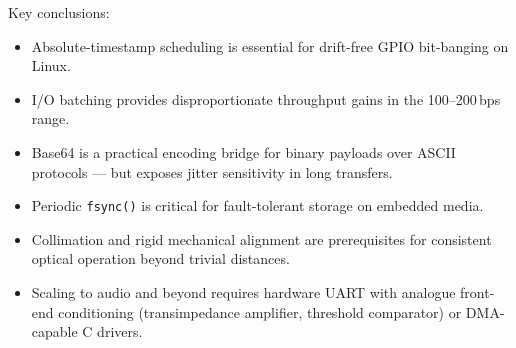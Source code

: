 \documentclass[10pt, twocolumn, a4paper]{article}
\begin{document}
Key conclusions:

\begin{itemize}[leftmargin=12pt, itemsep=2pt]
  \item Absolute-timestamp scheduling is essential for drift-free GPIO bit-banging on Linux.
  \item I/O batching provides disproportionate throughput gains in the 100–200\,bps range.
  \item Base64 is a practical encoding bridge for binary payloads over ASCII protocols — but exposes jitter sensitivity in long transfers.
  \item Periodic \texttt{fsync()} is critical for fault-tolerant storage on embedded media.
  \item Collimation and rigid mechanical alignment are prerequisites for consistent optical operation beyond trivial distances.
  \item Scaling to audio and beyond requires hardware UART with analogue front-end conditioning (transimpedance amplifier, threshold comparator) or DMA-capable C drivers.
\end{itemize}

\appendix
\onecolumn
\end{document}
